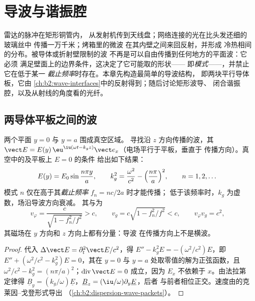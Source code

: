 \chapter{导波与谐振腔}\label{ch:b2:guided-waves}

雷达的脉冲在矩形铜管内，
从发射机传到天线盘；网络连接的光在比头发还细的玻璃丝中
传播一万千米；烤箱里的微波
在其内壁之间来回反射，并形成
冷热相间的分布。被导体或折射壁限制的波
不再是可以自由传播到任何地方的平面波：它必须
满足壁面上的边界条件，这决定了它可能取的形状——
即\emph{模式}——，并禁止它在低于某一
\emph{截止频率}时存在。本章先构造最简单的导波结构，
即两块平行导体板，它由
\cref{ch:b2:wave-interfaces}中的反射得到；随后讨论矩形波导、
闭合谐振腔，以及从射线的角度看的光纤。

\section{两导体平板之间的波}

\begin{proposition}[平行板导波的模式]\label{prop:b2:guided-waves:plates}
两个平面 $y = 0$ 与 $y = a$ 围成真空区域。
寻找沿 $z$ 方向传播的波，其 $\vect E = E(y)\,\eu^{\iu(\omega t - k_gz)}
\vect e_x$（电场平行于平板，垂直于
传播方向）。真空中的及平板上 $E = 0$ 的条件
给出如下结果：
\[
E(y) = E_0\sin\frac{n\pi y}a , \qquad
k_g^2 = \frac{\omega^2}{c^2} - \Bigl(\frac{n\pi}a\Bigr)^2 , \qquad n = 1, 2, \dots
\]
模式 $n$ 仅在高于其\emph{截止频率} $f_n = nc/2a$ 时才能传播；
低于该频率时，$k_g$ 为虚数，场沿导波方向衰减。
其与为
\[
v_\varphi = \frac c{\sqrt{1 - f_n^2/f^2}} > c , \qquad
v_g = c\sqrt{1 - f_n^2/f^2} < c , \qquad v_\varphi v_g = c^2 ,
\]
其磁场在 $y$ 方向和 $z$ 方向上都有分量：导波
在传播方向上不是横波。
\end{proposition}

\begin{proof}
代入 $\Delta\vect E = \partial_t^2\vect E/c^2$，得 $E'' - k_g^2E = -(\omega^2/c^2)E$，即
$E'' + (\omega^2/c^2 - k_g^2)E = 0$，其在 $y = 0$ 与
$y = a$ 处取零值的解为正弦函数，且 $\omega^2/c^2 - k_g^2 = (n\pi/a)^2$；$\operatorname{div}
\vect E = 0$ 成立，因为 $E_x$ 不依赖于 $x$。由法拉第定律得
$\underline B_y = (k_g/\omega)\underline E$，$\underline B_z = (\iu/\omega)\partial_y\underline E$，后者
与前者相位正交。速度由的克莱因–戈登形式导出
（\cref{ch:b2:dispersion-wave-packets}）。
\end{proof}

